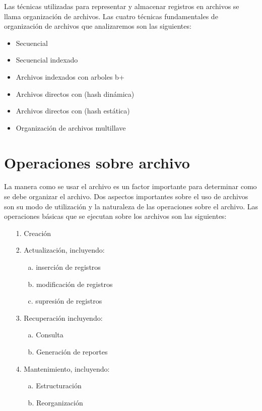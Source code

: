 Las técnicas utilizadas para representar y almacenar registros en archivos se llama organización de archivos. Las cuatro técnicas fundamentales de organización de archivos que analizaremos son las siguientes:
\begin{itemize}
\item Secuencial 
\item Secuencial indexado
\item Archivos indexados con arboles b+
\item Archivos directos con (hash dinámica)
\item Archivos directos con (hash estática)
\item Organización de archivos multillave
\end{itemize}

\chapter[Operaciones sobre archivo]{Operaciones sobre archivo}

La manera como se usar el archivo es un factor importante para determinar como se debe organizar el archivo. Dos aspectos importantes sobre el uso de archivos son su modo de utilización y la naturaleza de las operaciones sobre el archivo.
Las operaciones básicas que se ejecutan sobre los archivos son las siguientes:

\begin{itemize}
\item[1.] Creación
\item[2.] Actualización, incluyendo:
\begin{itemize}
\item[a.] inserción de registros
\item[b.] modificación de registros
\item[c.] supresión de registros
\end{itemize}
\item[3.] Recuperación incluyendo:
\begin{itemize}
\item[a.] Consulta
\item[b.] Generación de reportes
\end{itemize}
\item[4.] Mantenimiento, incluyendo:
\begin{itemize}
\item[a. ] Estructuración 
\item[b. ] Reorganización
\end{itemize}
\end{itemize}

